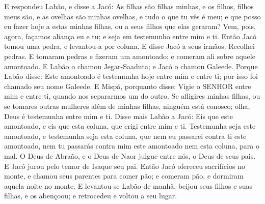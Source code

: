{{E respondeu Labão, e disse a Jacó: As filhas são filhas minhas, e os filhos, filhos meus são, e as ovelhas são minhas ovelhas, e tudo o que tu vês é meu; e que posso eu fazer hoje a estas minhas filhas, ou a seus filhos que elas geraram?
Vem, pois, agora, façamos aliança eu e tu; e seja em testemunho entre mim e ti.
Então Jacó tomou uma pedra, e levantou-a por coluna.
E disse Jacó a seus irmãos: Recolhei pedras. E tomaram pedras e fizeram um amontoado; e comeram ali sobre aquele amontoado.
E Labão o chamou Jegar-Saaduta; e Jacó o chamou Galeede.
Porque Labão disse: Este amontoado é testemunha hoje entre mim e entre ti; por isso foi chamado seu nome Galeede.
E Mispá, porquanto disse: Vigie o SENHOR entre mim e entre ti, quando nos separarmos um do outro.
Se afligires minhas filhas, ou se tomares outras mulheres além de minhas filhas, ninguém está conosco; olha, Deus é testemunha entre mim e ti.
Disse mais Labão a Jacó: Eis que este amontoado, e eis que esta coluna, que erigi entre mim e ti.
Testemunha seja este amontoado, e testemunha seja esta coluna, que nem eu passarei contra ti este amontoado, nem tu passarás contra mim este amontoado nem esta coluna, para o mal.
O Deus de Abraão, e o Deus de Naor julgue entre nós, o Deus de seus pais. E Jacó jurou pelo temor de Isaque seu pai.
Então Jacó ofereceu sacrifícios no monte, e chamou seus parentes para comer pão; e comeram pão, e dormiram aquela noite no monte.
E levantou-se Labão de manhã, beijou seus filhos e suas filhas, e os abençoou; e retrocedeu e voltou a seu lugar.

\par}

}
